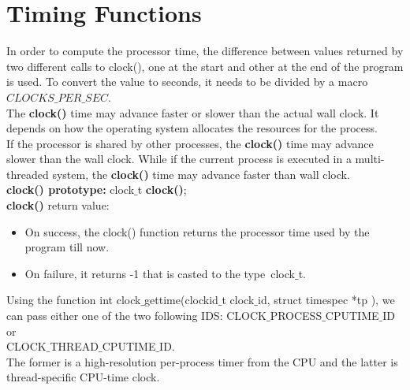 \documentclass[]{scrartcl}
\begin{document}
	\section{Timing Functions}
	In order to compute the processor time, the difference between values returned by two different calls to clock(), one at the start and other at the end of the program is used. To convert the value to seconds, it needs to be divided by a macro $CLOCKS\_PER\_SEC$. \\
	The \textbf{clock()} time may advance faster or slower than the actual wall clock. It depends on how the operating system allocates the resources for the process. \\
	If the processor is shared by other processes, the \textbf{clock()} time may advance slower than the wall clock. While if the current process is executed in a multi-threaded system, the \textbf{clock()} time may advance faster than wall clock.\\
	\textbf{clock() prototype:} clock$\_$t \textbf{clock()}; \\
	\textbf{clock()} return value: 
	\begin{itemize}
		\item On success, the clock() function returns the processor time used by the program till now.
		\item On failure, it returns -1 that is casted to the type clock$\_$t.
	\end{itemize}
	Using the function int clock$\_$gettime(clockid$\_$t clock$\_$id,
	struct timespec *tp ), we can pass either one of the two following IDS: CLOCK$\_$PROCESS$\_$CPUTIME$\_$ID or \\ CLOCK$\_$THREAD$\_$CPUTIME$\_$ID. \\ The former is a high-resolution per-process timer from the CPU and the latter is thread-specific CPU-time clock.
\end{document}

